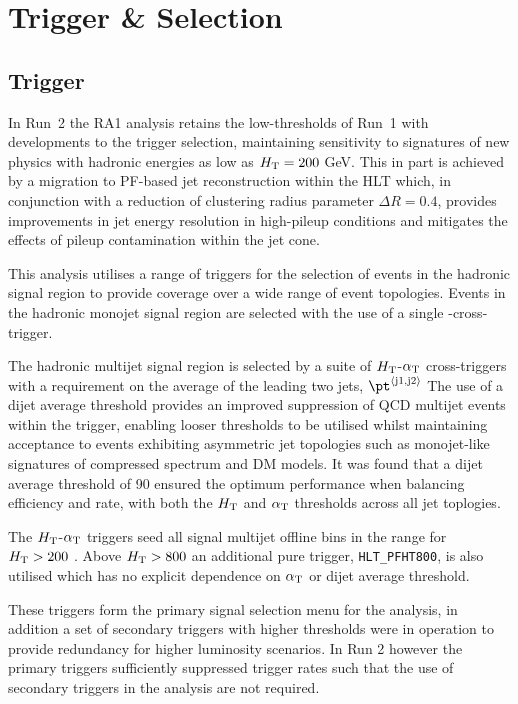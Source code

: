 \section{Trigger \& Selection}
\label{selection}

\subsection{Trigger}


In Run~2 the RA1 analysis retains the low-thresholds of Run~1 with developments 
to the trigger selection, maintaining sensitivity to signatures of new physics with hadronic 
energies as low as $\mbox{$H_\text{T}$} = 200$ GeV. This in part is achieved by a migration to PF-based 
jet reconstruction within the HLT which, in conjunction with a reduction of clustering radius 
parameter $\Delta R = 0.4$, provides improvements in jet energy resolution in high-pileup 
conditions and mitigates the effects of pileup contamination within the jet cone.

This analysis utilises a range of triggers for the selection of events in the hadronic signal region
to provide coverage over a wide range of event topologies. 
Events in the hadronic monojet signal region are selected with the use of a single \mht-\met cross-trigger.

The hadronic multijet signal region is selected by a suite of $\mbox{$H_\text{T}$}$-$\alpha_{\text{T}}$ cross-triggers 
with a requirement on the average \pt of the leading two jets, $\pt^{\rm \left<j1,j2\right>}$
The use of a dijet average threshold provides an improved  suppression of QCD multijet events within the trigger,
enabling looser \alphat thresholds to be utilised whilst maintaining acceptance to events exhibiting asymmetric jet 
topologies such as monojet-like signatures of compressed spectrum and DM models. It was found that a dijet average
threshold of 90 \GeV ensured the optimum performance when balancing efficiency and rate, with both the $\mbox{$H_\text{T}$}$ and $\alpha_{\text{T}}$
thresholds across all jet toplogies. 

The $\mbox{$H_\text{T}$}$-$\alpha_{\text{T}}$ triggers seed all signal multijet offline bins in the range for $\mbox{$H_\text{T}$} > 200$ \GeV. 
Above $\mbox{$H_\text{T}$} > 800$ an additional pure \scalht trigger, \verb!HLT_PFHT800!, is also utilised which has
 no explicit dependence on $\alpha_{\text{T}}$ or dijet average threshold. 

These triggers form the primary signal selection menu for the analysis, in addition a set of secondary triggers with 
higher thresholds were in operation to provide redundancy for higher luminosity scenarios. In Run 2 however the primary 
triggers sufficiently suppressed trigger rates such that the use of secondary triggers in the analysis are not required.


